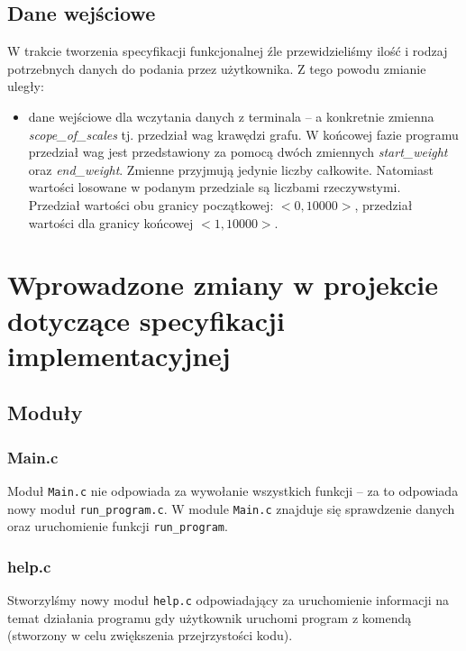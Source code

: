 \documentclass[12pt, a4paper]{article}
\begin{document}
\subsection{Dane wejściowe}
W trakcie tworzenia specyfikacji funkcjonalnej źle przewidzieliśmy ilość i rodzaj potrzebnych danych do podania przez użytkownika. Z tego powodu zmianie uległy:
\begin{itemize}
    \item dane wejściowe dla wczytania danych z terminala -- a konkretnie zmienna \textit{scope\_of\_scales} tj. przedział wag krawędzi grafu. W końcowej fazie programu przedział wag jest przedstawiony za pomocą dwóch zmiennych \textit{start\_weight} oraz \textit{end\_weight}. Zmienne przyjmują jedynie liczby całkowite. Natomiast wartości losowane w podanym przedziale są liczbami rzeczywstymi.\\ Przedział wartości obu granicy początkowej: $<0, 10000>$, przedział wartości dla granicy końcowej $<1, 10000>$.
\end{itemize}


\section{Wprowadzone zmiany w projekcie dotyczące specyfikacji implementacyjnej}
\subsection{Moduły}

\subsubsection{Main.c}
Moduł \texttt{Main.c} nie odpowiada za wywołanie wszystkich funkcji -- za to odpowiada nowy moduł \texttt{run\_program.c}. W module \texttt{Main.c} znajduje się sprawdzenie danych oraz uruchomienie funkcji \texttt{run\_program}.

\subsubsection{help.c}
Stworzylśmy nowy moduł \texttt{help.c} odpowiadający za uruchomienie informacji na temat działania programu gdy użytkownik uruchomi program z komendą  (stworzony w celu zwiększenia przejrzystości kodu).
\end{document}
